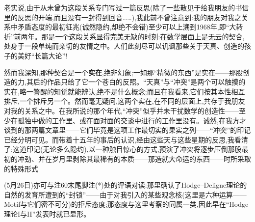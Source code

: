 老实说,由于从未曾为这段关系专门写过一篇反思(除了一些散见于给我朋友的书信里的反思的开端,而且没有一封得到回音……),我此前不曾注意到:我的朋友对我之关系中矛盾态度的最初征兆(诚然隐约,却绝不会错)至少可以上溯到1968年,即“大转折”前两年。那是一个这段关系显得完美无缺的时刻:在数学层面上是无云的契合,处身于一段单纯而亲切的友情之中。人们此刻尽可以讥讽那些关于天真、创造的孩子的美好“长篇大论”!

然而我深知,那种契合是一个\textbf{实在},绝非幻象;一如那“精微的东西”是实在——那股创造的力,其后的作品只给了它一个苍白的反照。“天真”与“冲突”是两个可以触摸的实在,略一警醒的知觉就能辨认,绝不是什么概念;而且在我看来,它们按其本性相互排斥,一个排斥另一个。然而毫无疑问,这两个实在,在不同的层面上,共存于我朋友对我的关系之中。在我所说的那个年代,“冲突”似乎并未干扰数学的创造性——至少在\dmark{}孤独中做的工作里、或在面对面的交谈中进行的工作里没有。诚然,在我方才谈到的那两篇文章里——它们毕竟是这项工作最切实的果实之列——“冲突”的印记已经分明可见。而带着十五年的事后的认识,经由这些天与这些星期的反思,我看清了:这道印记(无论多么隐约),以一种触目惊心的方式,预演了冲突将逐步压倒那股最初的冲劲、并在岁月里剥除其最稀有的本质——那造就大命运的东西——时所采取的特殊形式


(5月26日)亦可与注60末尾脚注(*)处的评语对读:那里确认了Hodge--Deligne理论的自然的发育所遭到的“封锁”——由于对我引入的某些观念核(这里是六种运算——Motif与它们密不可分)的拒斥态度;那态度与这里考察的同属一类,因此早在“Hodge理论I与II”发表时就已显形。

